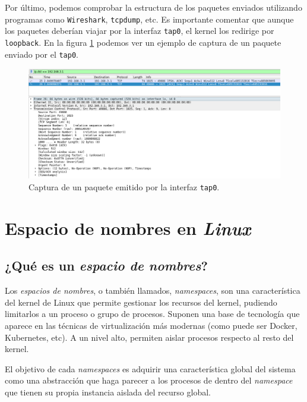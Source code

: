 \documentclass[12pt]{article}
\begin{document}
	\pagebreak
	
	\noindent Por último, podemos comprobar la estructura de los paquetes enviados utilizando programas como \texttt{Wireshark}, \texttt{tcpdump}, etc. Es importante comentar que aunque los paquetes deberían viajar por la interfaz \texttt{tap0}, el kernel los redirige por \texttt{loopback}. En la figura \ref{img: wireshark tuntap} podemos ver un ejemplo de captura de un paquete enviado por el \texttt{tap0}.
	
	\begin{figure}[h!]
		\begin{center}
			\includegraphics[width=1\textwidth]{img/wireshark_tuntap.png}
			\caption{Captura de un paquete emitido por la interfaz \texttt{tap0}.}
			\label{img: wireshark tuntap}
		\end{center}
	\end{figure}
	
	
	\pagebreak
	\section{Espacio de nombres en \textit{Linux}}
	\label{sect: espacio nombres}
	\subsection{¿Qué es un \textit{espacio de nombres}?}
	\noindent Los \textit{espacios de nombres}, o también llamados, \textit{namespaces}, son una característica del kernel de Linux que permite gestionar los recursos del kernel, pudiendo limitarlos a un proceso o grupo de procesos. Suponen una base de tecnología que aparece en las técnicas de virtualización más modernas (como puede ser Docker, Kubernetes, etc). A un nivel alto, permiten aislar procesos respecto al resto del kernel. \\
	
	\par \noindent El objetivo de cada \textit{namespaces} es adquirir una característica global del sistema como una abstracción que haga parecer a los procesos de dentro del \textit{namespace} que tienen su propia instancia aislada del recurso global.
	
\end{document}
